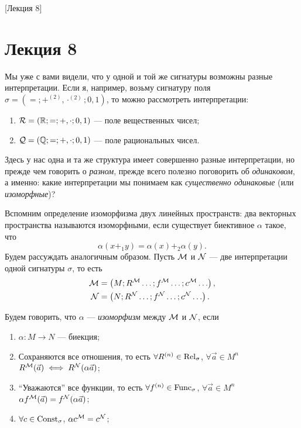 [Лекция 8]

\section{Лекция 8}

Мы уже с вами видели, что у одной и той же сигнатуры возможны разные интерпретации.
Если я, например, возьму сигнатуру поля $\sigma = \left( =; +^{(2)}, \cdot^{(2)}; 0, 1 \right)$, то можно рассмотреть интерпретации:
\begin{enumerate}
    \item $\mathcal{R} = \left( \mathbb{R}; =; +, \cdot; 0, 1 \right)$ --- поле вещественных чисел;
    \item $\mathcal{Q} = \left( \mathbb{Q}; =; +, \cdot; 0, 1 \right)$ --- поле рациональных чисел. 
\end{enumerate}
Здесь у нас одна и та же структура имеет совершенно разные интерпретации, но прежде чем говорить о {\it разном}, прежде всего полезно поговорить об {\it одинаковом}, а именно: какие интерпретации мы понимаем как {\it существенно одинаковые} (или {\it изоморфные})?

Вспомним определение изоморфизма двух линейных пространств: два векторных пространства называются изоморфными, если существует биективное $\alpha$ такое, что
$$
    \alpha(x +_{1} y) = \alpha(x) +_{2} \alpha(y).
$$
Будем рассуждать аналогичным образом.
Пусть $\mathcal{M}$ и $\mathcal{N}$ --- две интерпретации одной сигнатуры $\sigma$, то есть
\begin{align}
    \mathcal{M} &= \left( M; R^{\mathcal{M}} \ldots; f^{\mathcal{M}} \ldots; c^{\mathcal{M}} \ldots \right), \\
    \mathcal{N} &= \left( N; R^{\mathcal{N}} \ldots; f^{\mathcal{N}} \ldots; c^{\mathcal{N}} \ldots \right).
\end{align}

\begin{definition} \label{def::isomorphism-on-structures}
    Будем говорить, что $\alpha$ --- {\it изоморфизм} между $\mathcal{M}$ и $\mathcal{N}$, если
    \begin{enumerate}
        \item $\alpha \colon M \to N$ --- биекция;
        \item Сохраняются все отношения, то есть $\forall R^{(n)} \in \mathrm{Rel}_{\sigma}$, $\forall \vec{a} \in M^{n}$ $R^{\mathcal{M}}(\vec{a}) \iff R^{\mathcal{N}}(\alpha \vec{a})$;
        \item \enquote{Уважаются} все функции, то есть $\forall f^{(n)} \in \mathrm{Func}_{\sigma}$, $\forall \vec{a} \in M^{n}$ $\alpha f^{\mathcal{M}}(\vec{a}) = f^{\mathcal{N}}(\alpha \vec{a})$;
        \item $\forall c \in \mathrm{Const}_{\sigma}$, $\alpha c^{\mathcal{M}} = c^{\mathcal{N}}$;
    \end{enumerate}
\end{definition}

